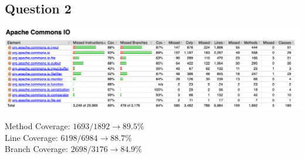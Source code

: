 \subsection*{Question 2}

\begin{center}
        \includegraphics[width=1.1\textwidth]{img/jacoco1.png}
\end{center}

\noindent Method Coverage: $1693/1892 \rightarrow 89.5\%$ \\
\noindent Line Coverage: $6198/6984 \rightarrow 88.7\%$\\
\noindent Branch Coverage: $2698/3176 \rightarrow 84.9\%$